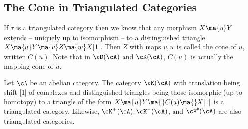 \subsection{The Cone in Triangulated Categories}

If $\tau$ is a triangulated category then we know that any morphism $X \ma{u} Y$ extends -- uniquely up to isomorphism -- to a distinguished triangle $X \ma{u} Y \ma{v} Z \ma{w} X[1]$. Then $Z$ with maps $v,w$ is called the cone of $u$, written $C(u)$. Note that in $\cD(\cA)$ and $\cK(\cA)$, $C(u)$ is actually the mapping cone of $u$.

\begin{thm}
Let $\cA$ be an abelian category. The category $\cK(\cA)$ with translation being shift [1] of complexes and distinguished triangles being those isomorphic (up to homotopy) to a triangle of the form $X \ma{u} Y \ma{} C(u) \ma{} X[1]$ is a triangulated category. Likewise, $\cK^+(\cA), \cK^-(\cA)$, and $\cK^b(\cA)$ are also triangulated categories. 
\end{thm}

